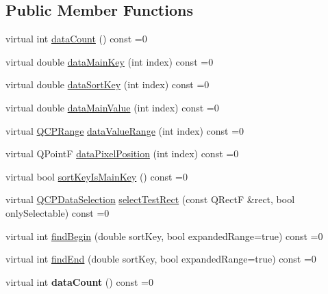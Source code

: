 \subsection*{Public Member Functions}
\begin{DoxyCompactItemize}
\item 
virtual int \hyperlink{class_q_c_p_plottable_interface1_d_a058a22c770ef4d5a0e878a7f02183da9}{data\+Count} () const =0
\item 
virtual double \hyperlink{class_q_c_p_plottable_interface1_d_a2bd60daaac046945fead558cbd83cf73}{data\+Main\+Key} (int index) const =0
\item 
virtual double \hyperlink{class_q_c_p_plottable_interface1_d_afdc92f9f01e7e35f2e96b2ea9dc14ae7}{data\+Sort\+Key} (int index) const =0
\item 
virtual double \hyperlink{class_q_c_p_plottable_interface1_d_af6330919e8023277d08c958a6074fc76}{data\+Main\+Value} (int index) const =0
\item 
virtual \hyperlink{class_q_c_p_range}{Q\+C\+P\+Range} \hyperlink{class_q_c_p_plottable_interface1_d_a9ca7fcf14d885a200879768679b19be9}{data\+Value\+Range} (int index) const =0
\item 
virtual Q\+PointF \hyperlink{class_q_c_p_plottable_interface1_d_a78911838cfbcfd2d8df9ad2fdbfb8e93}{data\+Pixel\+Position} (int index) const =0
\item 
virtual bool \hyperlink{class_q_c_p_plottable_interface1_d_a229e65e7ab968dd6cd0e259fa504b79d}{sort\+Key\+Is\+Main\+Key} () const =0
\item 
virtual \hyperlink{class_q_c_p_data_selection}{Q\+C\+P\+Data\+Selection} \hyperlink{class_q_c_p_plottable_interface1_d_a67093e4ccf490ff5f7750640941ff34c}{select\+Test\+Rect} (const Q\+RectF \&rect, bool only\+Selectable) const =0
\item 
virtual int \hyperlink{class_q_c_p_plottable_interface1_d_a5b95783271306a4de97be54eac1e7d13}{find\+Begin} (double sort\+Key, bool expanded\+Range=true) const =0
\item 
virtual int \hyperlink{class_q_c_p_plottable_interface1_d_a5deced1016bc55a41a2339619045b295}{find\+End} (double sort\+Key, bool expanded\+Range=true) const =0
\item 
\mbox{\label{class_q_c_p_plottable_interface1_d_adf4ce17d263b506df80d0ac37e497432}} 
virtual int {\bfseries data\+Count} () const =0
\item 
\mbox{\label{class_q_c_p_plottable_interface1_d_a572ed2583cb6a2bb590a265c3fc2b004}} 

\end{DoxyCompactItemize}
